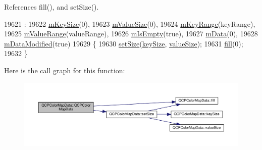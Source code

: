 References fill(), and set\+Size().


\begin{DoxyCode}
19621                                                                                                            
            :
19622   \hyperlink{class_q_c_p_color_map_data_a354e06462023340fbc03894b22499f6d}{mKeySize}(0),
19623   \hyperlink{class_q_c_p_color_map_data_ae8ee9093632a59f55eb4fc06579ed256}{mValueSize}(0),
19624   \hyperlink{class_q_c_p_color_map_data_aaaafd0d7d0f153dbd152f3daf34254ee}{mKeyRange}(keyRange),
19625   \hyperlink{class_q_c_p_color_map_data_a225bb96f10c1a27b51ae59249477dbef}{mValueRange}(valueRange),
19626   \hyperlink{class_q_c_p_color_map_data_a10e91aa89ed05bd177b1f81e07b465b8}{mIsEmpty}(\textcolor{keyword}{true}),
19627   \hyperlink{class_q_c_p_color_map_data_ac1682862022f575191351c9825187d39}{mData}(0),
19628   \hyperlink{class_q_c_p_color_map_data_ad3cc682da2ac14e5acdbc05cf4d3d93b}{mDataModified}(\textcolor{keyword}{true})
19629 \{
19630   \hyperlink{class_q_c_p_color_map_data_a0d9ff35c299d0478b682bfbcdd9c097e}{setSize}(\hyperlink{class_q_c_p_color_map_data_aa8d7811686fdfea964947715210c4af8}{keySize}, \hyperlink{class_q_c_p_color_map_data_ab880be6bc587f34e8d22fe77ef6b57e9}{valueSize});
19631   \hyperlink{class_q_c_p_color_map_data_a350f783260eb9b5de5c7b5e0d5d3e3c2}{fill}(0);
19632 \}
\end{DoxyCode}


Here is the call graph for this function\+:\nopagebreak
\begin{figure}[H]
\begin{center}
\leavevmode
\includegraphics[width=350pt]{class_q_c_p_color_map_data_aac9d8eb81e18e240d89d56c01933fd23_cgraph}
\end{center}
\end{figure}


\hypertarget{class_q_c_p_color_map_data_a7ac252031d0921520d5bccb6bfa23a8b}{}
